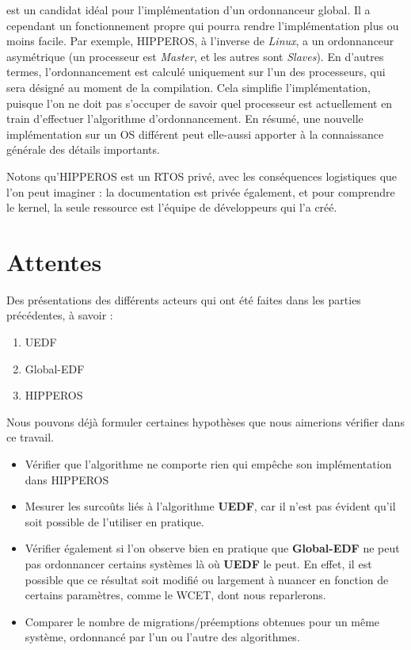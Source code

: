 	 est un candidat idéal pour l'implémentation d'un ordonnanceur 
	global. Il a cependant un fonctionnement propre qui pourra rendre l'implémentation 
	plus ou moins facile. Par exemple, HIPPEROS, à l'inverse de \textit{Linux}, a un ordonnanceur 
	asymétrique (un processeur est \textit{Master}, et les autres sont \textit{Slaves}).
	En d'autres termes, l'ordonnancement est calculé uniquement sur l'un des processeurs, 
	qui sera désigné au moment de la compilation. 
	Cela simplifie l'implémentation, puisque l'on ne doit pas s'occuper de savoir quel processeur est 
	actuellement en train d'effectuer l'algorithme d'ordonnancement.\newline
	En résumé, une nouvelle implémentation sur un OS différent 
	peut elle-aussi apporter à la connaissance générale des détails importants.\newline
	
	Notons qu'HIPPEROS est un RTOS privé, avec les conséquences logistiques que l'on peut 
	imaginer : la documentation est privée également, et pour comprendre le kernel, la 
	seule ressource est l'équipe de développeurs qui l'a créé. 
	
		
\section{Attentes}

	Des présentations des différents acteurs qui ont été faites dans les parties précédentes, à savoir :
	\begin{enumerate}
		\setlength\itemsep{0.1em}
		\item UEDF
		\item Global-EDF
		\item HIPPEROS
	\end{enumerate}

	\label{hyp}
	Nous pouvons déjà formuler certaines hypothèses que nous aimerions vérifier dans ce travail. \newline
	
	\begin{itemize}
		\item Vérifier que l'algorithme ne comporte rien qui empêche son implémentation dans 
		HIPPEROS
		\item Mesurer les surcoûts liés à l'algorithme \textbf{UEDF}, car il n'est pas 
		évident qu'il soit possible de l'utiliser en pratique.
		\item Vérifier également si l'on observe bien en pratique que \textbf{Global-EDF} ne 
		peut pas ordonnancer certains systèmes là où \textbf{UEDF} le peut.
		En effet, il est possible que ce résultat soit modifié ou largement à nuancer en 
		fonction de certains paramètres, comme le WCET, dont nous reparlerons.
		\item Comparer le nombre de migrations/préemptions obtenues pour un même système, ordonnancé 
		par l'un ou l'autre des algorithmes.
	\end{itemize}

